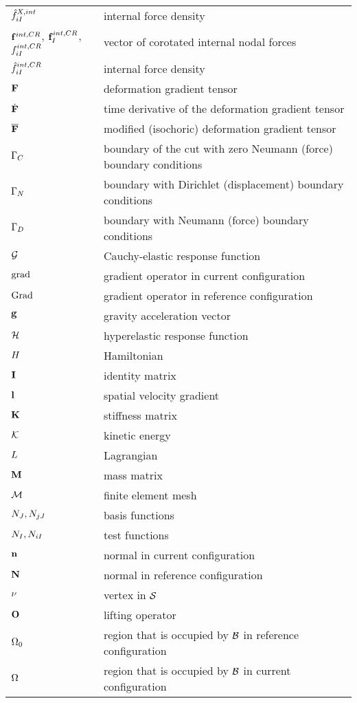 \begin{longtabu}{ R{2.4cm}  L{8cm} }
		$\hat{f} ^{X,int}_{iI} $ & internal force density \\	
		$\mathbf f ^{int,CR}$, $\mathbf f ^{int,CR}_I$, $f ^{int,CR}_{iI} $ & vector of corotated internal nodal forces \\
			$\hat{f} ^{int,CR}_{iI} $ & internal force density \\		
		$\mathbf {F } $& deformation gradient tensor \\
		$\dot{\mathbf {F }}  $& time derivative of the deformation gradient tensor\\
		$\mathbf {\overline{F} }$ & modified (isochoric) deformation gradient tensor \\
		$\Gamma _C$& boundary of the cut with zero Neumann (force) boundary conditions \\
		$\Gamma _N$& boundary with Dirichlet (displacement) boundary conditions \\
		$\Gamma _D$& boundary with Neumann (force) boundary conditions \\
		$\mathcal G $ & Cauchy-elastic response function\\ %
		$ \textnormal{grad}$ & gradient operator in current configuration\\
		$ \textnormal{Grad}$ & gradient operator in reference configuration\\		
		$\mathbf {g} $ & gravity acceleration vector \\		
		$\mathcal H $ & hyperelastic response function \\%
		$H$ & Hamiltonian\\
		$ \mathbf {I } $& identity matrix \\
		$\mathbf {l} $ & spatial velocity gradient \\
		$\mathbf K$ & stiffness matrix\\
		$\mathcal K $ & kinetic energy \\
		$L$ & Lagrangian \\
		$\mathbf M$ & mass matrix \\
		$\mathcal{M}$ & finite element mesh \\		
		$N_J , N_{jJ} $ & basis functions \\
		$N_I , N_{iI}$ & test functions \\
		$\mathbf {n} $ & normal in current configuration \\
		$\mathbf {N} $ & normal in reference configuration \\
		$\nu$& vertex in $\mathcal{S}$ \\
		$\mathbf O$& lifting operator \\
		$\Omega _0 $ & region that is occupied by $\mathcal{B} $ in reference configuration \\ %
		$\Omega $ & region that is occupied by $\mathcal{B} $ in current configuration \\

\end{longtabu}
